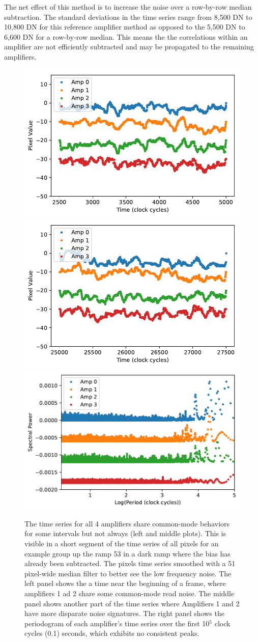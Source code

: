 \documentclass{aastex62}
\begin{document}
The net effect of this method is to increase the noise over a row-by-row median subtraction.
The standard deviations in the time series range from 8,500 DN to 10,800 DN for this reference amplifier method as opposed to the 5,500 DN to 6,600 DN for a row-by-row median.
This means the the correlations within an amplifier are not efficiently subtracted and may be propagated to the remaining amplifiers.

\begin{figure}[!hbtp]
\centering
\includegraphics[width=.32\columnwidth]{pixeltime_series_0.pdf}
\includegraphics[width=.32\columnwidth]{pixeltime_series_1.pdf}
\includegraphics[width=.32\columnwidth]{all_amp_periodograms.pdf}
\caption{The time series for all 4 amplifiers share common-mode behaviors for some intervals but not always (left and middle plots).
This is visible in a short segment of the time series of all pixels for an example group up the ramp 53 in a dark ramp where the bias has already been subtracted.
The pixels time series smoothed with a 51 pixel-wide median filter to better see the low frequency noise.
The left panel shows the a time near the beginning of a frame, where amplifiers 1 ad 2 share some common-mode read noise.
The middle panel shows another part of the time series where Amplifiers 1 and 2 have more disparate noise signatures.
The right panel shows the periodogram of each amplifier's time series over the first 10$^5$ clock cycles (0.1) seconds, which exhibits no consistent peaks.
}\label{fig:darkPixelTimeSeries}
\end{figure}
\end{document}
